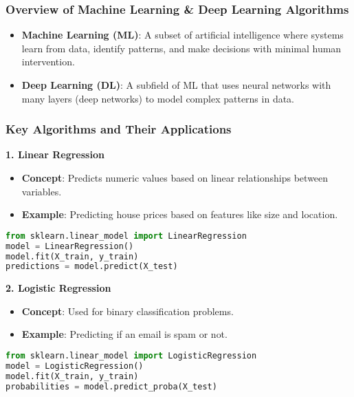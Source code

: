 \documentclass[aspectratio=169]{beamer}
\begin{document}
\begin{frame}[fragile]
    \frametitle{Overview of Machine Learning \& Deep Learning Algorithms}
    \begin{itemize}
        \item \textbf{Machine Learning (ML)}: A subset of artificial intelligence where systems learn from data, identify patterns, and make decisions with minimal human intervention.
        \item \textbf{Deep Learning (DL)}: A subfield of ML that uses neural networks with many layers (deep networks) to model complex patterns in data.
    \end{itemize}
\end{frame}

\begin{frame}[fragile]
    \frametitle{Key Algorithms and Their Applications}
    \textbf{1. Linear Regression}
    \begin{itemize}
        \item \textbf{Concept}: Predicts numeric values based on linear relationships between variables.
        \item \textbf{Example}: Predicting house prices based on features like size and location.
    \end{itemize}
    \begin{lstlisting}[language=Python]
from sklearn.linear_model import LinearRegression
model = LinearRegression()
model.fit(X_train, y_train)
predictions = model.predict(X_test)
    \end{lstlisting}

    \textbf{2. Logistic Regression}
    \begin{itemize}
        \item \textbf{Concept}: Used for binary classification problems.
        \item \textbf{Example}: Predicting if an email is spam or not.
    \end{itemize}
    \begin{lstlisting}[language=Python]
from sklearn.linear_model import LogisticRegression
model = LogisticRegression()
model.fit(X_train, y_train)
probabilities = model.predict_proba(X_test)
    \end{lstlisting}
\end{frame}
\end{document}
